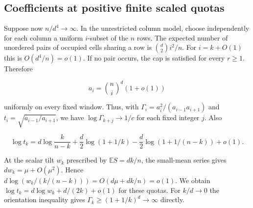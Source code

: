 \subsection{Coefficients at positive finite scaled quotas}

Suppose now $n/d^4\to\infty$. In the unrestricted column model, choose independently for each column a uniform $i$-subset of the $n$ rows. The expected number of unordered pairs of occupied cells sharing a row is $\binom d2 i^2/n$. For $i=k+O(1)$ this is $O(d^4/n)=o(1)$. If no pair occurs, the cap is satisfied for every $r\ge1$. Therefore

\begin{equation*}
a_i=\binom ni^d(1+o(1))
\end{equation*}

uniformly on every fixed window. Thus, with $\Gamma_i=a_i^2/(a_{i-1}a_{i+1})$ and $t_i=\sqrt{a_{i-1}/a_{i+1}}$, we have $\log\Gamma_{k+j}\to1/c$ for each fixed integer $j$. Also

\begin{equation*}
\log t_k=d\log\frac{k}{n-k}+\frac d2\log(1+1/k)-\frac d2\log(1+1/(n-k))+o(1).
\end{equation*}

At the scalar tilt $w_k$ prescribed by $\mathbb E S=dk/n$, the small-mean series gives $dw_k=\mu+O(\mu^2)$. Hence $d\log(w_k/(k/(n-k)))=O(d\mu+dk/n)=o(1)$. We obtain $\log t_k=d\log w_k+d/(2k)+o(1)$ for these quotas. For $k/d\to0$ the orientation inequality gives $\Gamma_k\ge(1+1/k)^d\to\infty$ directly.
